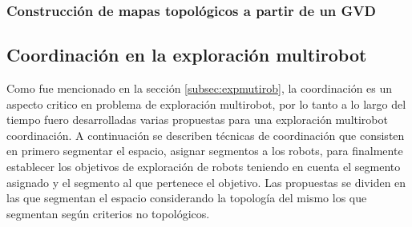 \cite{Lau2013}

\subsubsection{Construcción de mapas topológicos a partir de un GVD}
\cite{Liu2015}










\subsection{Coordinación en la exploración multirobot}
Como fue mencionado en la sección \ref{subsec:expmutirob}, la coordinación es un aspecto critico en problema de exploración multirobot, por lo tanto a lo largo del tiempo fuero desarrolladas varias propuestas para una exploración multirobot coordinación. A continuación se describen técnicas de coordinación que consisten en primero segmentar el espacio, asignar segmentos a los robots, para finalmente establecer los objetivos de exploración de robots teniendo en cuenta el segmento asignado y el segmento al que pertenece el objetivo. Las propuestas se dividen en las que segmentan el espacio considerando la topología del mismo los que segmentan según criterios no topológicos.
